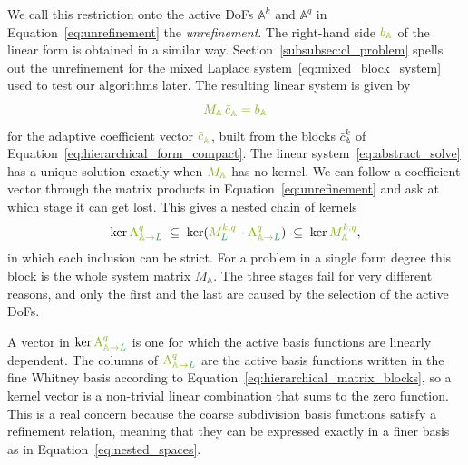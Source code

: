 \documentclass[a4paper, 12pt]{article}
\newcommand{\guidance}[1]{{\color{lime!70!black} #1}}
\newcommand{\green}{\color{ForestGreen}}
\renewcommand{\L}{{\green L}}
\newcommand{\freeVec}[3]{ {#1}^{#2}_{#3}}
\newcommand{\Amat}[3]{\mathbf{\mathrm{A}}^{#1}_{#2 \to #3}}
\newcommand{\activeDoFs}{\mathbb{A}}
\newcommand{\activeDoFSet}[2]{\activeDoFs^{#1}_{#2}}
\theoremstyle{definition}
\theoremstyle{plain}
\numberwithin{equation}{section}
\begin{document}
We call this restriction onto the active DoFs $\activeDoFSet{k}{}$ and $\activeDoFSet{q}{}$ in Equation~\eqref{eq:unrefinement} the \emph{unrefinement}. The right-hand side $\guidance{b_{\activeDoFs}}$ of the linear form is obtained in a similar way. \guidance{Section~\ref{subsubsec:cl_problem}} spells out the unrefinement for the mixed Laplace system~\eqref{eq:mixed_block_system} used to test our algorithms later. The resulting linear system is given by
\begin{equation}
    \label{eq:abstract_solve}
    \guidance{M_{\activeDoFs} \, \freeVec{\bar{c}}{}{\activeDoFs} = b_{\activeDoFs}}
\end{equation}
for the adaptive coefficient vector $\guidance{\freeVec{\bar{c}}{}{\activeDoFs}}$, \guidance{built from the blocks $\freeVec{\bar{c}}{k}{\activeDoFs}$ of} Equation~\eqref{eq:hierarchical_form_compact}. The linear system~\eqref{eq:abstract_solve} has a unique solution exactly when $\guidance{M_{\activeDoFs}}$ has no kernel. We can follow a coefficient vector through the matrix products in Equation~\eqref{eq:unrefinement} and ask at which stage it can get lost. This gives a nested chain of kernels
\begin{equation}
    \label{eq:kernel_chain}
    \ker \guidance{\Amat{q}{\activeDoFs}{\L}} \; \subseteq \; \ker ( \guidance{M^{k,q}_\L} \, \cdot \guidance{\Amat{q}{\activeDoFs}{\L}} ) \; \subseteq \; \ker \guidance{M^{k,q}_{\activeDoFs}},
\end{equation}
in which each inclusion can be strict. \guidance{For a problem in a single form degree this block is the whole system matrix $M_{\activeDoFs}$.} The three stages fail for very different reasons, and only the first and the last are caused by the selection of the active DoFs.

\smallskip

A vector in $\ker \guidance{\Amat{q}{\activeDoFs}{\L}}$ is one for which the active basis functions are linearly dependent. The columns of $\guidance{\Amat{q}{\activeDoFs}{\L}}$ are the active basis functions written in the fine Whitney basis according to Equation~\eqref{eq:hierarchical_matrix_blocks}, so a kernel vector is a non-trivial linear combination that sums to the zero function. This is a real concern because the coarse subdivision basis functions satisfy a refinement relation, meaning that they can be expressed exactly in a finer basis as in Equation~\eqref{eq:nested_spaces}.
\end{document}
